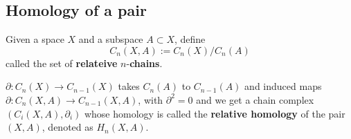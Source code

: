 \documentclass{article}
\begin{document}
\subsection{Homology of a pair}

\begin{definition}
    Given a space $X$ and a subspace $A\subset X$, define
    \[C_n(X,A):= C_n(X)/C_n(A)\]
    called the set of \textbf{relateive} $n$-\textbf{chains}.\par
    $\partial:C_n(X)\to C_{n-1}(X)$ takes $C_n(A)$ to $C_{n-1}(A)$ and induced maps $\partial:C_n(X,A)\to C_{n-1}(X,A)$, with $\partial^2 = 0$ and we get a chain complex $(C_i(X,A), \partial_i)$ whose homology is called the \textbf{relative homology} of the pair $(X,A)$, denoted as $H_n(X,A)$.
\end{definition}
\end{document}
